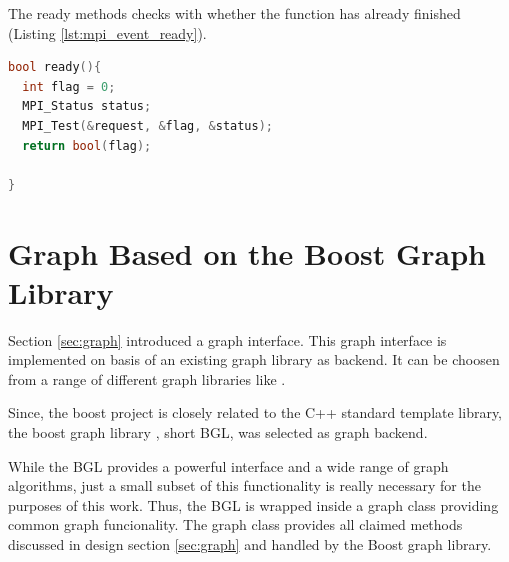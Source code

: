 The ready methods checks with  whether the function has
already finished (Listing \ref{lst:mpi_event_ready}).

\begin{lstlisting}[language=C++, label=lst:mpi_event_ready]
bool ready(){
  int flag = 0;
  MPI_Status status;
  MPI_Test(&request, &flag, &status);
  return bool(flag);

}
\end{lstlisting}



\section{Graph Based on the Boost Graph Library}

Section \ref{sec:graph} introduced a graph interface.  This graph
interface is implemented on basis of an existing graph library as
backend. It can be choosen from a range of different graph libraries
like \cite{ref:lemon, ref:boost_bgl, ref:igraph, ref:ogdf}.

Since, the boost project is closely related to the C++ standard
template library, the boost graph library \cite{ref:boost_bgl}, short
BGL, was selected as graph backend.

While the BGL provides a powerful interface and a wide range of graph
algorithms, just a small subset of this functionality is really
necessary for the purposes of this work. Thus, the BGL is wrapped
inside a graph class providing common graph funcionality.  The
graph class provides all claimed methods discussed in design section
\ref{sec:graph} and handled by the Boost graph library.


